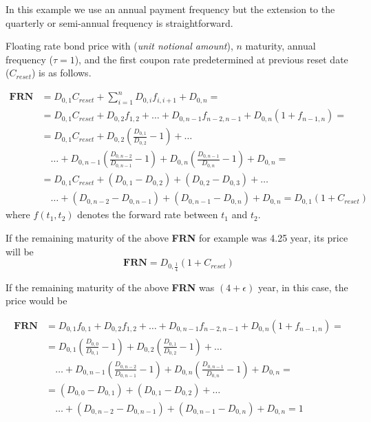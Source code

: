 \documentclass[12pt,a4paper]{article}
\begin{document}
In this example we use an annual payment frequency but the extension to the quarterly or semi-annual frequency is straightforward.

Floating rate bond price with (\emph{unit notional amount}), $n$ maturity, annual frequency ($\tau=1$), and the first coupon rate predetermined at previous reset date ($C_{reset}$) is as follows.

\begin{equation}
	\begin{aligned}
		\textbf{FRN} & = D_{0,1}C_{reset} + \sum_{i=1}^nD_{0,i}f_{i,i+1} + D_{0,n}= \\
		& = D_{0,1}C_{reset} + D_{0,2}f_{1,2} + \ldots + D_{0,n-1}f_{n-2,n-1}+ D_{0,n}(1+f_{n-1,n}) = \\
		& = D_{0,1}C_{reset} + D_{0,2}\left(\frac{D_{0,1}}{D_{0,2}}-1\right) + \ldots \\
		&\quad\ldots + D_{0,n-1}\left(\frac{D_{0,n-2}}{D_{0,n-1}}-1\right) + D_{0,n}\left(\frac{D_{0,n-1}}{D_{0,n}}-1\right) + D_{0,n} = \\
		& = D_{0,1}C_{reset} + (D_{0,1} - D_{0,2}) + (D_{0,2} - D_{0,3}) + \ldots \\
		&\quad\ldots + (D_{0,n-2} - D_{0,n-1}) + (D_{0,n-1} - D_{0,n}) + D_{0,n} = \boxed{D_{0,1} (1 +C_{reset})}
	\end{aligned}
\end{equation}
where $f(t_1,t_2)$ denotes the forward rate between $t_1$ and $t_2$.

If the remaining maturity of the above \textbf{FRN} for example was 4.25 year, its price will be
\begin{equation}
	\textbf{FRN} = D_{0,\frac{1}{4}}(1+C_{reset})
\end{equation}

If the remaining maturity of the above \textbf{FRN} was $(4 + \epsilon)$ year, in this case, the price would be

\begin{equation}
	\begin{aligned}
		\textbf{FRN} &= D_{0,1}f_{0,1}+ D_{0,2}f_{1,2} + \ldots + D_{0,n-1}f_{n-2,n-1} + D_{0,n}(1+f_{n-1,n}) = \\
		& = D_{0,1}\left(\frac{D_{0,0}}{D_{0,1}}-1\right) + D_{0,2}\left(\frac{D_{0,1}}{D_{0,2}}-1\right) + \ldots \\
		&\quad\ldots + D_{0,n-1}\left(\frac{D_{0,n-2}}{D_{0,n-1}}-1\right) + D_{0,n}\left(\frac{D_{0,n-1}}{D_{0,n}}-1\right) + D_{0,n} = \\
		&= (D_{0,0}-D_{0,1})+(D_{0,1}-D_{0,2}) + \ldots \\
		&\quad\ldots + (D_{0,n-2}-D_{0,n-1})+(D_{0,n-1}-D_{0,n})+D_{0,n} = 1
	\end{aligned}
\end{equation}
\end{document}
